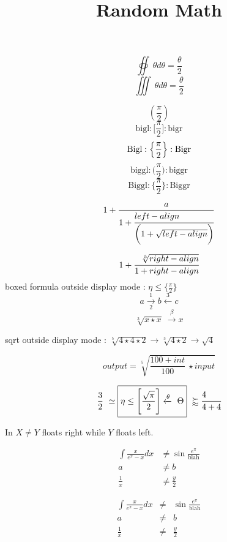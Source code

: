 \documentclass{article}
\title{Random Math}
\begin{document}
\maketitle
$$\oiint ~\theta{}d\theta = \frac{\theta}{2}$$
$$\iiint ~\theta{}d\theta = \frac{\theta}{2}$$

$$(\frac{\pi}{2})$$
$$\textrm{bigl} : \bigl[ \frac{\pi}{2} \bigr] : \textrm{bigr}$$
$$\textrm{Bigl} : \Bigl\{ \frac{\pi}{2}\Bigr\} : \textrm{Bigr}$$
$$\textrm{biggl} : \biggl( \frac{\pi}{2}\biggr) : \textrm{biggr}$$
$$\textrm{Biggl} : \Biggl\{ \frac{\pi}{2} \Biggr\} : \textrm{Biggr}$$

$$1+\frac{a}{1+\cfrac[l]{left-align}{\biggl(1 + \sqrt{left-align}\biggr)}}$$

$$1+\cfrac[r]{\sqrt[5]{right-align}}{1 + right-align}$$
boxed formula outside display mode : $\boxed{\eta \leq \bigl\{\frac{\pi}{2}\bigr\}}$
$$a \xrightarrow[2]{1} b \xleftarrow{3} c$$
$$\sqrt[3]{x \star x}~\xrightarrow{\beta} x$$

sqrt outside display mode : $\sqrt[5]{4 \star 4 \star 2} \to \sqrt[3]{4 \star 2}\to \sqrt{4}$

$$output = \sqrt[5]{\frac{100+int}{100} ~\star input}$$

$$\frac{3}{2} ~\simeq \boxed{\eta \leq \Biggl[\frac{\sqrt{\pi}}{2}\Biggr] \xleftarrow{\theta} ~\Theta} ~\succapprox \cfrac[l]{4}{4+4}$$

In $X \ne Y$ floats right while $Y$ floats left.

\begin{align*}
\int \frac{x}{e^x-x} dx &\ne \sin \frac{e^\pi}{\text{blah}} \\
a &\ne b \\
\frac{1}{x} &\ne \frac{y}{2}
\end{align*}

\[
\begin{array}{rcl}
\int \frac{x}{e^x-x} dx & \ne & \sin \frac{e^\pi}{\text{blah}} \\
a & \ne & b \\
\frac{1}{x} & \ne & \frac{y}{2}
\end{array}
\]
\end{document}
